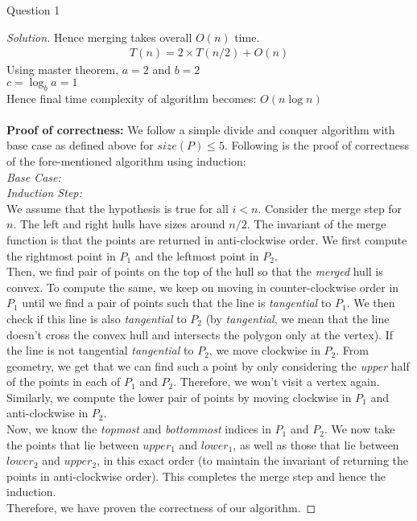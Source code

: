 \begin{solution}{Question 1}
\begin{proof}[Solution]
        Hence merging takes overall $O(n)$ time.
        \begin{equation}
            \begin{split}
                T(n)= 2\times T(n/2)+O(n)
            \end{split}
        \end{equation}
        Using master theorem, $a=2$ and $b=2$\\
        $c=\log_b a = 1 $\\
        Hence final time complexity of algorithm becomes: $O(n \log n)$\\
        \\
        \textbf{Proof of correctness:}
        We follow a simple divide and conquer algorithm with base case as defined above for $size(P) \leq 5$. Following is the proof of correctness of the fore-mentioned algorithm using induction:\\
        \textit{Base Case:}\\
        
        
        \textit{Induction Step:}\\
        We assume that the hypothesis is true for all $i < n$. Consider the merge step for $n$. The left and right hulls have sizes around $n/2$. The invariant of the merge function is that the points are returned in anti-clockwise order. We first compute the rightmost point in $P_1$ and the leftmost point in $P_2$.\\
        Then, we find pair of points on the top of the hull so that the \textit{merged} hull is convex. To compute the same, we keep on moving in counter-clockwise order in $P_1$ until we find a pair of points such that the line is \textit{tangential} to $P_1$. We then check if this line is also \textit{tangential} to $P_2$ (by \textit{tangential}, we mean that the line doesn't cross the convex hull and intersects the polygon only at the vertex). If the line is not tangential \textit{tangential} to $P_2$, we move clockwise in $P_2$. From geometry, we get that we can find such a point by only considering the \textit{upper} half of the points in each of $P_1$ and $P_2$. Therefore, we won't visit a vertex again.\\
        Similarly, we compute the lower pair of points by moving clockwise in $P_1$ and anti-clockwise in $P_2$.\\
        Now, we know the \textit{topmost} and \textit{bottommost} indices in $P_1$ and $P_2$. We now take the points that lie between $upper_1$ and $lower_1$, as well as those that lie between $lower_2$ and $upper_2$, in this exact order (to maintain the invariant of returning the points in anti-clockwise order). This completes the merge step and hence the induction.\\
        Therefore, we have proven the correctness of our algorithm.
    
    \end{proof}
\end{solution}
